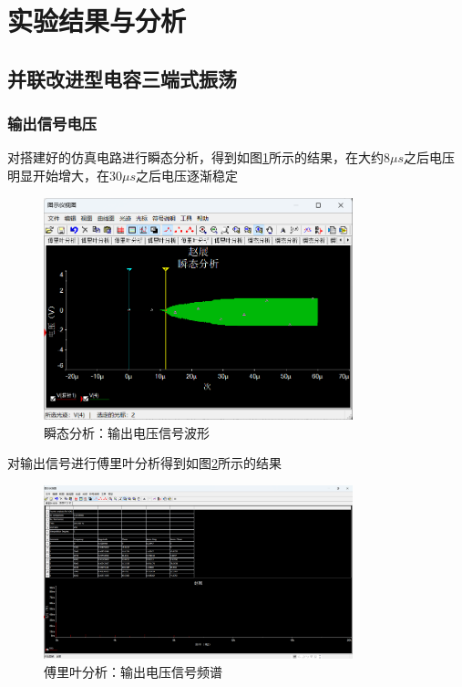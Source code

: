 \documentclass[UTF8]{ctexart}
\begin{document}
\section{实验结果与分析}

\subsection{并联改进型电容三端式振荡}
\subsubsection{输出信号电压}
对搭建好的仿真电路进行瞬态分析，得到如图\ref{img:5}所示的结果，在大约8$\mu s$之后电压明显开始增大，在30$\mu s$之后电压逐渐稳定
\begin{figure}[htbp]
    \centering
    \includegraphics[width=0.8\textwidth]{5.png}
    \caption{瞬态分析：输出电压信号波形}
    \label{img:5}
\end{figure}
对输出信号进行傅里叶分析得到如图\ref{img:16}所示的结果
\begin{figure}[htbp]
    \centering
    \includegraphics[width=0.8\textwidth]{16.png}
    \caption{傅里叶分析：输出电压信号频谱}
    \label{img:16}
\end{figure}
\end{document}
